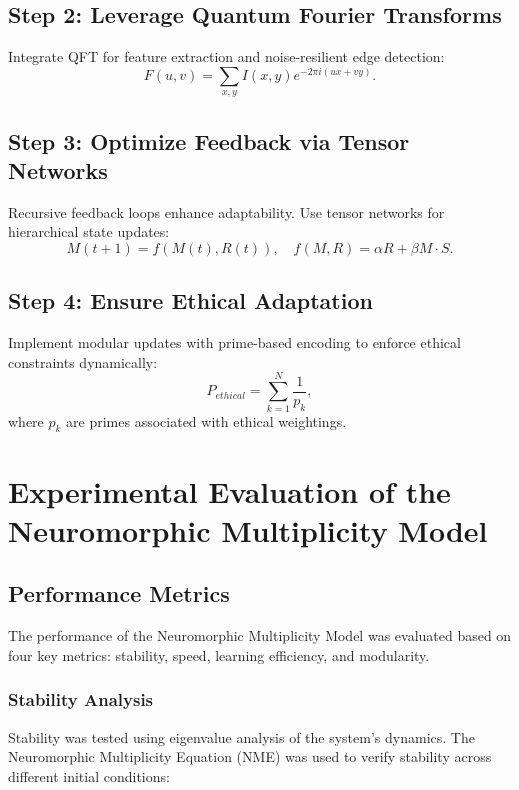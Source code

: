 \documentclass{article}
\theoremstyle{plain}
\begin{document}
\subsection{Step 2: Leverage Quantum Fourier Transforms}
Integrate QFT for feature extraction and noise-resilient edge detection:
\begin{equation}
F(u, v) = \sum_{x, y} I(x, y)e^{-2\pi i (ux + vy)}.
\end{equation}

\subsection{Step 3: Optimize Feedback via Tensor Networks}
Recursive feedback loops enhance adaptability. Use tensor networks for hierarchical state updates:
\begin{equation}
M(t+1) = f(M(t), R(t)), \quad f(M, R) = \alpha R + \beta M \cdot S.
\end{equation}

\subsection{Step 4: Ensure Ethical Adaptation}
Implement modular updates with prime-based encoding to enforce ethical constraints dynamically:
\begin{equation}
P_{ethical} = \sum_{k=1}^N \frac{1}{p_k},
\end{equation}
where $p_k$ are primes associated with ethical weightings.

\section{Experimental Evaluation of the Neuromorphic Multiplicity Model}

\subsection{Performance Metrics}

The performance of the Neuromorphic Multiplicity Model was evaluated based on four key metrics: stability, speed, learning efficiency, and modularity.

\subsubsection{Stability Analysis}

Stability was tested using eigenvalue analysis of the system's dynamics. The Neuromorphic Multiplicity Equation (NME) was used to verify stability across different initial conditions:
\end{document}
